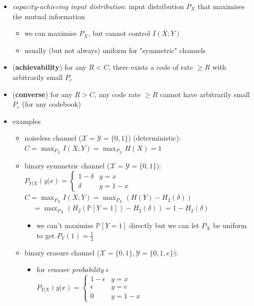 \documentclass[10pt, landscape]{article}
\begin{document}
\begin{multicols*}{4}
  \begin{itemize}
    \item \textit{capacity-achieving input distribution}: input distribution $P_X$ that maximises the mutual information
      \begin{itemize}
        \item we can maximise $P_X$, but cannot control $I(X;Y)$
        \item usually (but not always) uniform for "symmetric" channels
      \end{itemize}
    \item (\textbf{achievability}) for any $R<C$, there exists a code of rate $\geq R$ with arbitrarily small $P_e$
    \item (\textbf{converse}) for any $R>C$, any code rate $\geq R$ cannot have arbitrarily small $P_e$ (for any codebook)
    \item examples
      \begin{itemize}
        \item noiseless channel ($\mathcal{X} = \mathcal{Y} = \{0,1\}$) (deterministic): 
          \( {\displaystyle{ C=\max_{P_X} I(X;Y) = \max_{P_X} H(X) = 1 }} \) 
        \item binary symmetric channel ($\mathcal{X} = \mathcal{Y} = \{0,1\}$):
          $P_{Y\vert X}(y \vert x) = \begin{cases} 1-\delta &y=x \\ \delta &y=1-x \end{cases} $
          \( {\displaystyle{ C = \max_{P_X} I(X;Y) = \max_{P_X} (H(Y) - H_2 (\delta)) }} \) 
          \( {\displaystyle{ \,\quad = \max_{P_X} (H_2( \mathbb{P}[Y=1]) - H_2 (\delta)) = 1-H_2(\delta) }} \) 
          \begin{itemize}
            \item we can't maximise $\mathbb{P}[Y=1]$ directly but we can let $P_X$ be uniform to get $P_Y(1) = \frac{1}{2}$
          \end{itemize}
        \item binary erasure channel ($\mathcal{X} = \{0,1\}, \mathcal{Y} = \{0,1,e\}$):
          \begin{minipage}[c]{0.75\linewidth}
            \begin{itemize}
              \item for \textit{erasure probability} $\epsilon$ \\
                $P_{Y \vert X} (y \vert x) = \begin{cases} 1-\epsilon &y=x \\ \epsilon &y=e \\ 0 &y=1-x \end{cases}$

\end{itemize}
\end{minipage}
\end{itemize}
\end{itemize}
\end{multicols*}
\end{document}
